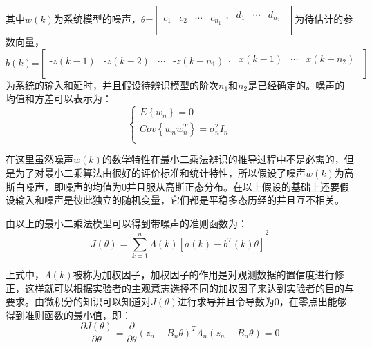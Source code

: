 其中$w(k)$为系统模型的噪声，$\theta \text{=}\left[ \begin{matrix}
   {{c}_{1}} & {{c}_{2}} & \cdots  & {{c}_{{{n}_{1}}}}\begin{matrix}
   , & {{d}_{1}} & \cdots  & {{d}_{{{n}_{2}}}}  \\
\end{matrix}  \\
\end{matrix} \right]$为待估计的参数向量，$b(k)\text{=}\left[ \begin{matrix}
   \text{-}z\left( k-1 \right) & \text{-}z\left( k-2 \right) & \cdots  & \text{-}z\left( k-{{n}_{1}} \right)\begin{matrix}
   , & x\left( k-1 \right) & \cdots  & x\left( k-{{n}_{2}} \right)  \\
\end{matrix}  \\
\end{matrix} \right]$为系统的输入和延时，并且假设待辨识模型的阶次${{n}_{1}}$和${{n}_{2}}$是已经确定的。噪声的均值和方差可以表示为：
\begin{equation}
\left\{  \begin{array}{l}
   E\left\{ {{w}_{n}} \right\}=0 \\ 
  Cov\left\{ {{w}_{n}}w_{n}^{T} \right\}=\sigma _{n}^{2}{{I}_{n}} \\ 
\end{array} \right.
\end{equation}

在这里虽然噪声$w(k)$的数学特性在最小二乘法辨识的推导过程中不是必需的，但是为了对最小二乘算法由很好的评价标准和统计特性，所以假设了噪声$w(k)$为高斯白噪声，即噪声的均值为0并且服从高斯正态分布。在以上假设的基础上还要假设输入和噪声是彼此独立的随机变量，它们都是平稳多态历经的并且互不相关。

由以上的最小二乘法模型可以得到带噪声的准则函数为：
\begin{equation}
J\left( \theta  \right)={{\sum\limits_{k=1}^{n}{\Lambda \left( k \right)\left[ a(k)-{{b}^{T}}(k)\theta  \right]}}^{2}}
\end{equation}

上式中，$\Lambda \left( k \right)$被称为加权因子，加权因子的作用是对观测数据的置信度进行修正，这样就可以根据实验者的主观意志选择不同的加权因子来达到实验者的目的与要求。由微积分的知识可以知道对$J\left( \theta  \right)$进行求导并且令导数为0，在零点出能够得到准则函数的最小值，即：
\begin{equation}
\frac{\partial J\left( \theta  \right)}{\partial \theta }=\frac{\partial }{\partial \theta }{{\left( {{z}_{n}}-{{B}_{n}}\theta  \right)}^{T}}{{\Lambda }_{n}}\left( {{z}_{n}}-{{B}_{n}}\theta  \right)=0
\end{equation}

